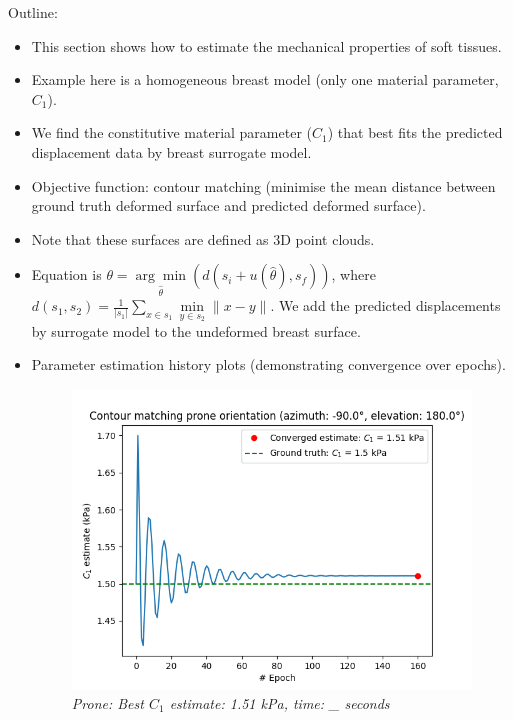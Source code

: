 \documentclass[11pt]{article}
\begin{document}
Outline:
\begin{itemize}
    \item This section shows how to estimate the mechanical properties of soft tissues. 
    \item Example here is a homogeneous breast model (only one material parameter, $C_1$). 
    \item We find the constitutive material parameter ($C_1$) that best fits the predicted displacement data by breast surrogate model. 
    \item Objective function: contour matching (minimise the mean distance between ground truth deformed surface and predicted deformed surface). 
    \item Note that these surfaces are defined as 3D point clouds. 
    \item Equation is $\theta = \underset{\hat{\theta}}{\arg\min}(d(s_{i} + u(\hat{\theta}), s_{f}))$, where $ d(s_1, s_2) = \frac{1}{|s_1|}\sum_{x \in s_{1}} \underset{y \in s_{2}}{\min} \lVert x-y \rVert $. We add the predicted displacements by surrogate model to the undeformed breast surface. 
    \item Parameter estimation history plots (demonstrating convergence over epochs). 
        \begin{figure}
            \centering
            \includegraphics[scale=0.8]{Images/breast/parameter_estimation/prone_parameter_estimate.png}
            \caption{\textit{\label{fig10}Prone: Best $C_1$ estimate: 1.51 kPa, time: \_ seconds}}
        \end{figure}


\end{itemize}
\end{document}
